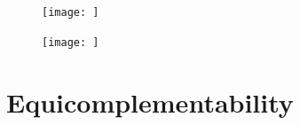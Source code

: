 \documentclass{article}
\begin{document}
\begin{figure}[ht]
    \centering
    \texttt{[image: ]}
    \caption{}
    \label{Fig_Rough_8}
\end{figure}

\begin{figure}[ht]
    \centering
    \texttt{[image: ]}
    \caption{} 
    \label{Fig_Rough_9}
\end{figure}

\FloatBarrier

\section{Equicomplementability}



\end{document}
